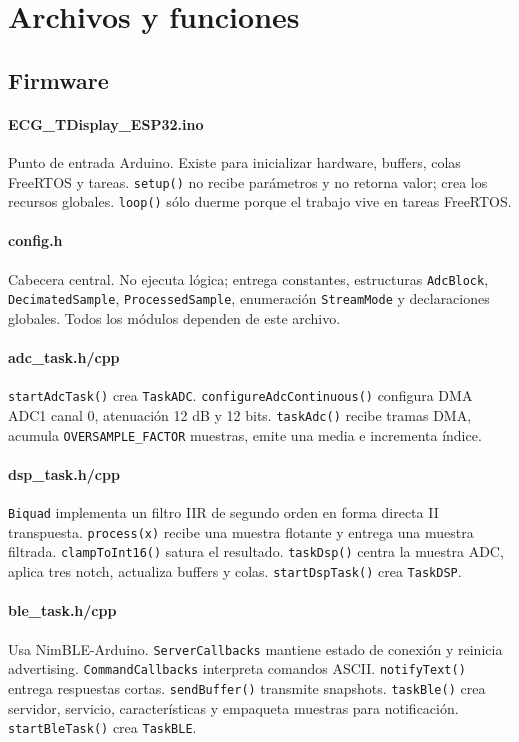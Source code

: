 \documentclass[11pt]{article}
\begin{document}
\section{Archivos y funciones}
\subsection{Firmware}
\paragraph{ECG\_TDisplay\_ESP32.ino} Punto de entrada Arduino. Existe para inicializar hardware, buffers, colas FreeRTOS y tareas. \texttt{setup()} no recibe parámetros y no retorna valor; crea los recursos globales. \texttt{loop()} sólo duerme porque el trabajo vive en tareas FreeRTOS.
\paragraph{config.h} Cabecera central. No ejecuta lógica; entrega constantes, estructuras \texttt{AdcBlock}, \texttt{DecimatedSample}, \texttt{ProcessedSample}, enumeración \texttt{StreamMode} y declaraciones globales. Todos los módulos dependen de este archivo.
\paragraph{adc\_task.h/cpp} \texttt{startAdcTask()} crea \texttt{TaskADC}. \texttt{configureAdcContinuous()} configura DMA ADC1 canal 0, atenuación 12 dB y 12 bits. \texttt{taskAdc()} recibe tramas DMA, acumula \texttt{OVERSAMPLE\_FACTOR} muestras, emite una media e incrementa índice.
\paragraph{dsp\_task.h/cpp} \texttt{Biquad} implementa un filtro IIR de segundo orden en forma directa II transpuesta. \texttt{process(x)} recibe una muestra flotante y entrega una muestra filtrada. \texttt{clampToInt16()} satura el resultado. \texttt{taskDsp()} centra la muestra ADC, aplica tres notch, actualiza buffers y colas. \texttt{startDspTask()} crea \texttt{TaskDSP}.
\paragraph{ble\_task.h/cpp} Usa NimBLE-Arduino. \texttt{ServerCallbacks} mantiene estado de conexión y reinicia advertising. \texttt{CommandCallbacks} interpreta comandos ASCII. \texttt{notifyText()} entrega respuestas cortas. \texttt{sendBuffer()} transmite snapshots. \texttt{taskBle()} crea servidor, servicio, características y empaqueta muestras para notificación. \texttt{startBleTask()} crea \texttt{TaskBLE}.
\end{document}
